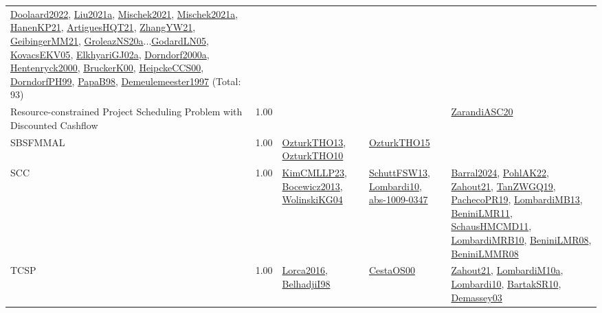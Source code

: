 {\begin{longtable}{p{3cm}r>{\raggedright\arraybackslash}p{6cm}>{\raggedright\arraybackslash}p{6cm}>{\raggedright\arraybackslash}p{8cm}}
\hyperref[detail:Doolaard2022]{Doolaard2022}, \hyperref[detail:Liu2021a]{Liu2021a}, \hyperref[detail:Mischek2021]{Mischek2021}, \hyperref[detail:Mischek2021a]{Mischek2021a}, \hyperref[detail:HanenKP21]{HanenKP21}, \hyperref[detail:ArtiguesHQT21]{ArtiguesHQT21}, \hyperref[detail:ZhangYW21]{ZhangYW21}, \hyperref[detail:GeibingerMM21]{GeibingerMM21}, \hyperref[detail:GroleazNS20a]{GroleazNS20a}...\hyperref[detail:GodardLN05]{GodardLN05}, \hyperref[detail:KovacsEKV05]{KovacsEKV05}, \hyperref[detail:ElkhyariGJ02a]{ElkhyariGJ02a}, \hyperref[detail:Dorndorf2000a]{Dorndorf2000a}, \hyperref[detail:Hentenryck2000]{Hentenryck2000}, \hyperref[detail:BruckerK00]{BruckerK00}, \hyperref[detail:HeipckeCCS00]{HeipckeCCS00}, \hyperref[detail:DorndorfPH99]{DorndorfPH99}, \hyperref[detail:PapaB98]{PapaB98}, \hyperref[detail:Demeulemeester1997]{Demeulemeester1997} (Total: 93)\\
\index{Resource-constrained Project Scheduling Problem with Discounted Cashflow}\index{Classification!Resource-constrained Project Scheduling Problem with Discounted Cashflow}Resource-constrained Project Scheduling Problem with Discounted Cashflow &  1.00 &  &  & \hyperref[detail:ZarandiASC20]{ZarandiASC20}\\
\index{SBSFMMAL}\index{Classification!SBSFMMAL}SBSFMMAL &  1.00 & \hyperref[detail:OzturkTHO13]{OzturkTHO13}, \hyperref[detail:OzturkTHO10]{OzturkTHO10} & \hyperref[detail:OzturkTHO15]{OzturkTHO15} & \\
\index{SCC}\index{Classification!SCC}SCC &  1.00 & \hyperref[detail:KimCMLLP23]{KimCMLLP23}, \hyperref[detail:Bocewicz2013]{Bocewicz2013}, \hyperref[detail:WolinskiKG04]{WolinskiKG04} & \hyperref[detail:SchuttFSW13]{SchuttFSW13}, \hyperref[detail:Lombardi10]{Lombardi10}, \hyperref[detail:abs-1009-0347]{abs-1009-0347} & \hyperref[detail:Barral2024]{Barral2024}, \hyperref[detail:PohlAK22]{PohlAK22}, \hyperref[detail:Zahout21]{Zahout21}, \hyperref[detail:TanZWGQ19]{TanZWGQ19}, \hyperref[detail:PachecoPR19]{PachecoPR19}, \hyperref[detail:LombardiMB13]{LombardiMB13}, \hyperref[detail:BeniniLMR11]{BeniniLMR11}, \hyperref[detail:SchausHMCMD11]{SchausHMCMD11}, \hyperref[detail:LombardiMRB10]{LombardiMRB10}, \hyperref[detail:BeniniLMR08]{BeniniLMR08}, \hyperref[detail:BeniniLMMR08]{BeniniLMMR08}\\
\index{TCSP}\index{Classification!TCSP}TCSP &  1.00 & \hyperref[detail:Lorca2016]{Lorca2016}, \hyperref[detail:BelhadjiI98]{BelhadjiI98} & \hyperref[detail:CestaOS00]{CestaOS00} & \hyperref[detail:Zahout21]{Zahout21}, \hyperref[detail:LombardiM10a]{LombardiM10a}, \hyperref[detail:Lombardi10]{Lombardi10}, \hyperref[detail:BartakSR10]{BartakSR10}, \hyperref[detail:Demassey03]{Demassey03}\\

\end{longtable}}
